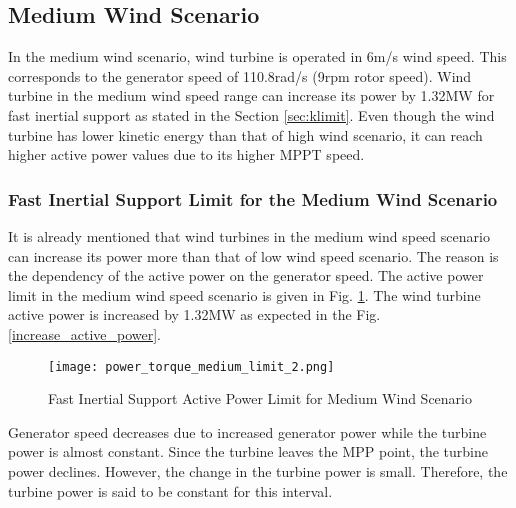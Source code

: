 \subsection{Medium Wind Scenario}
In the medium wind scenario, wind turbine is operated in 6m/s wind speed. This corresponds to the generator speed of 110.8rad/s (9rpm rotor speed). Wind turbine in the medium wind speed range can increase its power by 1.32MW for fast inertial support as stated in the Section \ref{sec:klimit}. Even though the wind turbine has lower kinetic energy than that of high wind scenario, it can reach higher active power values due to its higher MPPT speed. 
\subsubsection{Fast Inertial Support Limit for the Medium Wind Scenario}
It is already mentioned that wind turbines in the medium wind speed scenario can increase its power more than that of low wind speed scenario. The reason is the dependency of the active power on the generator speed. The active power limit in the medium wind speed scenario is given in Fig. \ref{medium_limit_power}. The wind turbine active power is increased by 1.32MW as expected in the Fig. \ref{increase_active_power}.\par
\begin{figure}[h]
	\centering
	\texttt{[image: power\_torque\_medium\_limit\_2.png]}
	\caption{Fast Inertial Support Active Power Limit for Medium Wind Scenario}
	\label{medium_limit_power}
\end{figure}
 Generator speed decreases due to increased generator power while the turbine power is almost constant. Since the turbine leaves the MPP point, the turbine power declines. However, the change in the turbine power is small. Therefore, the turbine power is said to be constant for this interval. 
